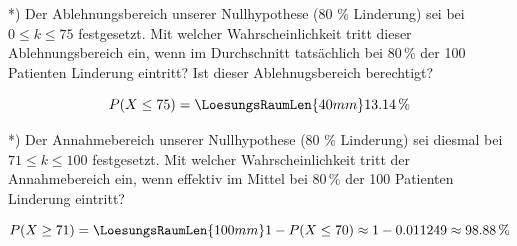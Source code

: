*) Der Ablehnungsbereich unserer Nullhypothese (80 \% Linderung) sei bei
$0 \le k \le 75$ festgesetzt. Mit welcher Wahrscheinlichkeit tritt
dieser Ablehnungsbereich ein, wenn im Durchschnitt tatsächlich bei 80\,\% der 100
Patienten Linderung eintritt? Ist dieser Ablehnugsbereich berechtigt?

$$P(X \le 75) = \LoesungsRaumLen{40mm}{13.14\,\%}$$


*) Der Annahmebereich unserer Nullhypothese (80 \% Linderung) sei
diesmal bei $71 \le k \le 100$ festgesetzt. Mit welcher Wahrscheinlichkeit tritt
der Annahmebereich ein, wenn effektiv im Mittel bei 80\,\% der 100
Patienten Linderung eintritt?

$$P(X \ge 71) = \LoesungsRaumLen{100mm}{1 - P(X \le 70) \approx 1 - 0.011249 \approx 98.88\,\%}$$


\newpage
